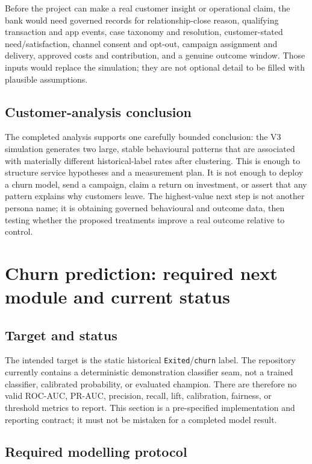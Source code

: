 \documentclass[a4paper,12pt]{article}
\begin{document}
Before the project can make a real customer insight or operational claim, the bank would need governed records for relationship-close reason, qualifying transaction and app events, case taxonomy and resolution, customer-stated need/satisfaction, channel consent and opt-out, campaign assignment and delivery, approved costs and contribution, and a genuine outcome window. Those inputs would replace the simulation; they are not optional detail to be filled with plausible assumptions.

\subsection{Customer-analysis conclusion}

The completed analysis supports one carefully bounded conclusion: the V3 simulation generates two large, stable behavioural patterns that are associated with materially different historical-label rates after clustering. This is enough to structure service hypotheses and a measurement plan. It is not enough to deploy a churn model, send a campaign, claim a return on investment, or assert that any pattern explains why customers leave. The highest-value next step is not another persona name; it is obtaining governed behavioural and outcome data, then testing whether the proposed treatments improve a real outcome relative to control.

\section{Churn prediction: required next module and current status}

\subsection{Target and status}

The intended target is the static historical \texttt{Exited}/\texttt{churn} label. The repository currently contains a deterministic demonstration classifier seam, not a trained classifier, calibrated probability, or evaluated champion. There are therefore no valid ROC-AUC, PR-AUC, precision, recall, lift, calibration, fairness, or threshold metrics to report. This section is a pre-specified implementation and reporting contract; it must not be mistaken for a completed model result.

\subsection{Required modelling protocol}
\end{document}
